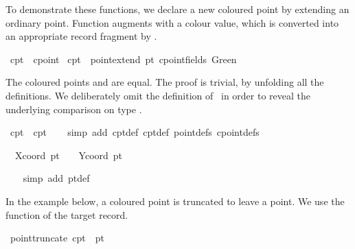 \begin{isabellebody}
\begin{isamarkuptext}
  To demonstrate these functions, we declare a new coloured point by
  extending an ordinary point.  Function  augments
   with a colour value, which is converted into an
  appropriate record fragment by .%
\end{isamarkuptext}%
\isamarkuptrue%
\isamarkupfalse%
\ cpt{}\ {\isacharcolon}{\isacharcolon}\ cpoint\ \isanewline
{\isachardoublequoteopen}cpt{}\ {\isasymequiv}\ point{\isachardot}extend\ pt{}\ {\isacharparenleft}cpoint{\isachardot}fields\ Green{\isacharparenright}{\isachardoublequoteclose}%
\begin{isamarkuptext}%
The coloured points  and  are equal.  The
  proof is trivial, by unfolding all the definitions.  We deliberately
  omit the definition of~ in order to reveal the underlying
  comparison on type .%
\end{isamarkuptext}%
\isamarkuptrue%
\isamarkupfalse%
\ {\isachardoublequoteopen}cpt{}\ {\isacharequal}\ cpt{}{\isachardoublequoteclose}\isanewline
%
\isadelimproof
\ \ %
\endisadelimproof
%
\isatagproof
{}\isamarkupfalse%
\ {\isacharparenleft}simp\ add{\isacharcolon}\ cpt{}{\isacharunderscore}def\ cpt{}{\isacharunderscore}def\ point{\isachardot}defs\ cpoint{\isachardot}defs{\isacharparenright}%
\begin{isamarkuptxt}%
\begin{isabelle}%
\ {}{\isachardot}\ Xcoord\ pt{}\ {\isacharequal}\ {}{}{}\ {\isasymand}\ Ycoord\ pt{}\ {\isacharequal}\ {}{}%
\end{isabelle}%
\end{isamarkuptxt}%
\isamarkuptrue%
\ \ \isamarkupfalse%
\ {\isacharparenleft}simp\ add{\isacharcolon}\ pt{}{\isacharunderscore}def{\isacharparenright}\isanewline
\ \ \isamarkupfalse%
%
\endisatagproof
{\isafoldproof}%
%
\isadelimproof
%
\endisadelimproof
%
\begin{isamarkuptext}%
In the example below, a coloured point is truncated to leave a
  point.  We use the  function of the target record.%
\end{isamarkuptext}%
\isamarkuptrue%
\isamarkupfalse%
\ {\isachardoublequoteopen}point{\isachardot}truncate\ cpt{}\ {\isacharequal}\ pt{}{\isachardoublequoteclose}\isanewline

\end{isabellebody}

